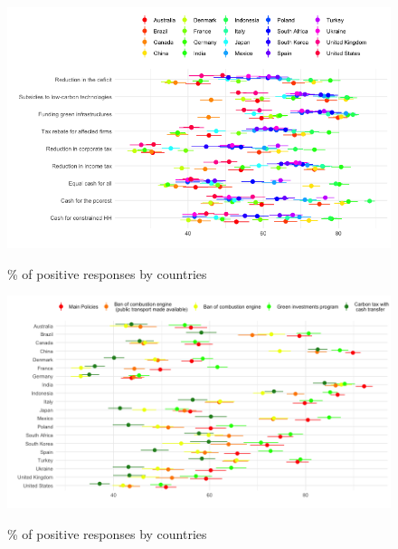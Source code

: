 \begin{frame}{}%
\begin{figure}[h!]
\caption{\% of positive responses by countries} %
\includegraphics[width=.7\paperwidth]{../figures/country_comparison/views_by_country.png} \\
\end{figure}
\end{frame}

\begin{frame}{}%
\begin{figure}[h!]
\caption{\% of positive responses by countries} %
\includegraphics[width=.7\paperwidth]{../figures/country_comparison/country_by_support.png} \\
\end{figure}
\end{frame}

